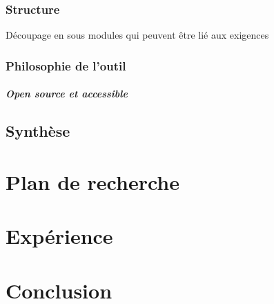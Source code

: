 \documentclass[10pt, french, a4paper]{report}
\begin{document}
\subsection{Structure}

Découpage en sous modules qui peuvent être lié aux exigences

\subsection{Philosophie de l'outil}

\paragraph{Open source et accessible}


\section{Synthèse}


\newpage
\chapter{Plan de recherche}


\newpage
\chapter{Expérience}


\newpage
\chapter*{Conclusion}

\newpage
% 


\end{document}
